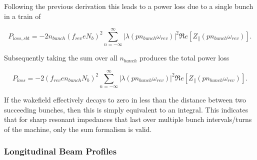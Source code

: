 Following the previous derivation this leads to a power loss due to a single bunch in a train of 

\begin{equation}
P_{loss, sbt} = - 2 n_{bunch} \left( f_{rev} e  N_{b} \right) ^{2} \displaystyle\sum\limits_{n = -\infty}^{\infty}  \left| \lambda \left( p n_{bunch} \omega_{rev} \right)  \right|^{2} \Re{}e \left[ Z_{\parallel} \left( p n_{bunch}\omega_{rev} \right) \right].
\label{eqn:power_loss_train_single_bunch}
\end{equation}

Subsequently taking the sum over all $n_{bunch}$ produces the total power loss 

\begin{equation}
P_{loss} = - 2 \left( f_{rev} e n_{bunch}  N_{b}\right)^{2} \displaystyle\sum\limits_{n = -\infty}^{\infty}  \left| \lambda \left( p n_{bunch} \omega_{rev} \right)  \right|^{2} \Re{}e \left[ Z_{\parallel} \left( p n_{bunch}\omega_{rev} \right) \right].
\label{eqn:heating-gen}
\end{equation}

If the wakefield effectively decays to zero in less than the distance between two succeeding bunches, then this is simply equivalent to an integral. This indicates that for sharp resonant impedances that last over multiple bunch intervals/turns of the machine, only the sum formalism is valid.

\subsubsection{Longitudinal Beam Profiles}

